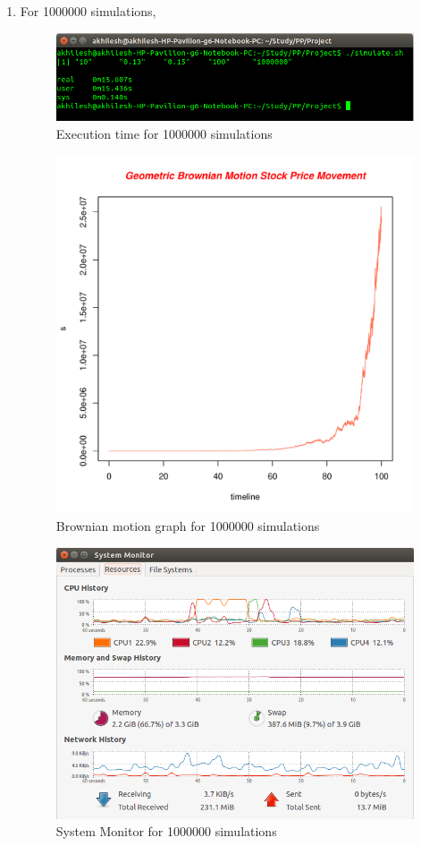 \documentclass[10pt,a4paper]{article}
\begin{document}
\begin{enumerate}
\newpage
\item For 1000000 simulations,\\
\begin{figure}[h]
\centering
\includegraphics[scale=0.5]{1000000}
\caption{Execution time for 1000000 simulations}
\end{figure}
\begin{figure}[h]
\centering
\includegraphics[scale=0.5]{1000000_graph.pdf}
\caption{Brownian motion graph for 1000000 simulations}
\end{figure}
\begin{figure}[H]
\centering
\includegraphics[scale=0.4]{1000000_sys_mon}
\caption{System Monitor for 1000000 simulations}
\end{figure}


\end{enumerate}
\end{document}
